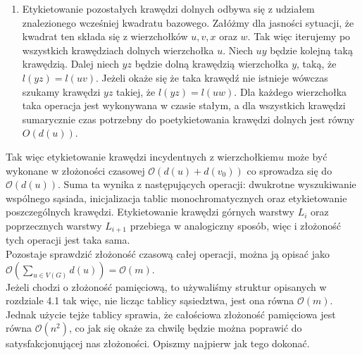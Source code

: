 \documentclass[12pt,a4paper,titlepage]{article}
\begin{document}
\begin{enumerate}
\begin{enumerate}[a)]
\end{enumerate} 
\item
Etykietowanie pozostałych krawędzi dolnych odbywa się z udziałem znalezionego wcześniej kwadratu bazowego. Załóżmy dla jasności sytuacji, że kwadrat ten składa się z wierzchołków $u,v,x$ oraz $w$. Tak więc iterujemy po wszystkich krawędziach dolnych wierzchołka $u$. Niech $uy$ będzie kolejną taką krawędzią. Dalej niech $yz$ będzie dolną krawędzią wierzchołka $y$, taką, że $l(yz)=l(uv)$. Jeżeli okaże się że taka krawędź nie istnieje wówczas szukamy krawędzi $yz$ takiej, że $l(yz)=l(uw)$. Dla każdego wierzchołka taka operacja jest wykonywana w czasie stałym, a dla wszystkich krawędzi sumarycznie czas potrzebny do poetykietowania krawędzi dolnych jest równy $O(d(u))$. \\
\end{enumerate}
Tak więc etykietowanie krawędzi incydentnych z wierzchołkiem$u$ może być wykonane w złożoności czasowej $\mathcal{O}(d(u) + d(v_0))$ co sprowadza się do $\mathcal{O}(d(u)) $. Suma ta wynika z następujących operacji: dwukrotne wyszukiwanie wspólnego sąsiada, inicjalizacja tablic monochromatycznych oraz etykietowanie poszczególnych krawędzi.
Etykietowanie krawędzi górnych warstwy $L_i$ oraz poprzecznych warstwy $L_{i+1}$ przebiega w analogiczny sposób, więc i złożoność tych operacji jest taka sama.\\
Pozostaje sprawdzić złożoność czasową całej operacji, można ją opisać jako \\
$\mathcal{O}(\sum _{u \in V(G)} d(u)) = \mathcal{O}(m)$.\\
Jeżeli chodzi o złożoność pamięciową, to używaliśmy struktur opisanych w rozdziale 4.1 tak więc, nie licząc tablicy sąsiedztwa, jest ona równa $\mathcal{O}(m)$. Jednak użycie tejże tablicy sprawia, że całościowa złożoność pamięciowa jest równa $\mathcal{O}(n^2)$, co jak się okaże za chwilę będzie można poprawić do satysfakcjonującej nas złożoności. Opiszmy najpierw jak tego dokonać.\\
\end{document}
